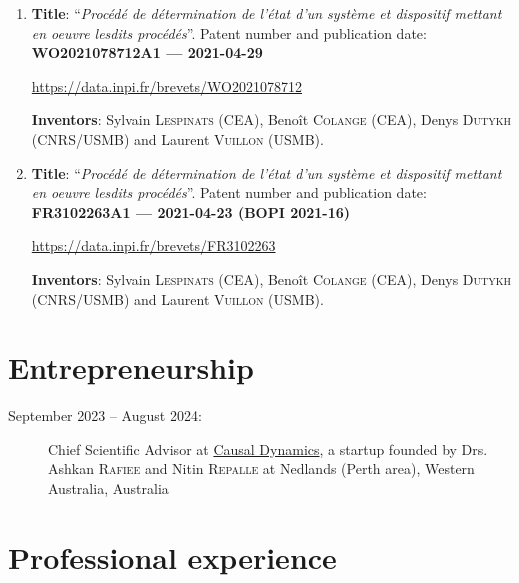 \documentclass[final, a4paper, oneside, 12pt]{article}
\numberwithin{equation}{section}
\begin{document}
\begin{enumerate}
  
  \item \textbf{Title}: ``\textit{Proc\'ed\'e de d\'etermination de l'\'etat d'un syst\`eme et dispositif mettant en oeuvre lesdits proc\'ed\'es}''. Patent number and publication date: \textbf{WO2021078712A1 --- 2021-04-29}
  
  \url{https://data.inpi.fr/brevets/WO2021078712}
  
  \textbf{Inventors}: Sylvain \textsc{Lespinats} (CEA), Beno\^it \textsc{Colange} (CEA), Denys \textsc{Dutykh} (CNRS/USMB) and Laurent \textsc{Vuillon} (USMB).
  
  
  \item \textbf{Title}: ``\textit{Proc\'ed\'e de d\'etermination de l'\'etat d'un syst\`eme et dispositif mettant en oeuvre lesdits proc\'ed\'es}''. Patent number and publication date: \textbf{FR3102263A1 --- 2021-04-23 (BOPI 2021-16)}
  
  \url{https://data.inpi.fr/brevets/FR3102263}
  
  \textbf{Inventors}: Sylvain \textsc{Lespinats} (CEA), Beno\^it \textsc{Colange} (CEA), Denys \textsc{Dutykh} (CNRS/USMB) and Laurent \textsc{Vuillon} (USMB).

\end{enumerate}


\section{Entrepreneurship}

\begin{description}

  \item[September 2023 -- August 2024:] Chief Scientific Advisor at \href{https://causaldynamics.ai/}{Causal Dynamics}, a startup founded by Drs. Ashkan \textsc{Rafiee} and Nitin \textsc{Repalle} at Nedlands (Perth area), Western Australia, Australia

\end{description}


\section{Professional experience}
\end{document}
